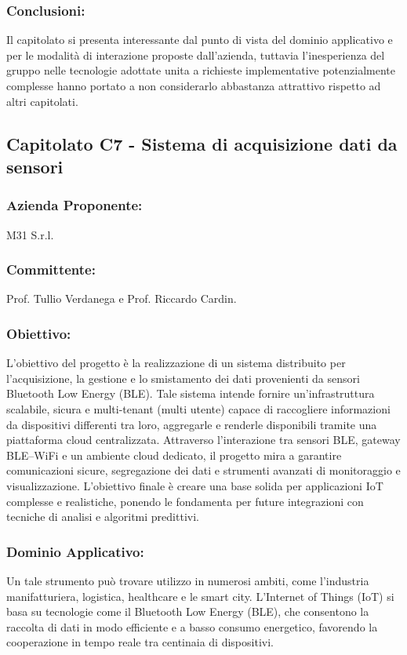 \documentclass[a4paper,12pt]{article}
\begin{document}
\subsubsection*{Conclusioni:}
Il capitolato si presenta interessante dal punto di vista del dominio applicativo e per le modalità di interazione proposte dall'azienda, tuttavia l'inesperienza del gruppo nelle tecnologie adottate unita a richieste implementative potenzialmente complesse hanno portato a non considerarlo abbastanza attrattivo rispetto ad altri capitolati.
\vspace{2.0cm}


\subsection{Capitolato C7 - Sistema di acquisizione dati da sensori}
\subsubsection*{Azienda Proponente:} M31 S.r.l.
\subsubsection*{Committente:} Prof. Tullio Verdanega e Prof. Riccardo Cardin.
\subsubsection*{Obiettivo:} 
L’obiettivo del progetto è la realizzazione di un sistema distribuito per l’acquisizione, la gestione e lo smistamento dei dati provenienti da sensori Bluetooth Low Energy (BLE). Tale sistema intende fornire un’infrastruttura scalabile, sicura e multi-tenant (multi utente) capace di raccogliere informazioni da dispositivi differenti tra loro, aggregarle e renderle disponibili tramite una piattaforma cloud centralizzata.
Attraverso l’interazione tra sensori BLE, gateway BLE–WiFi e un ambiente cloud dedicato, il progetto mira a garantire comunicazioni sicure, segregazione dei dati e strumenti avanzati di monitoraggio e visualizzazione. L’obiettivo finale è creare una base solida per applicazioni IoT complesse e realistiche, ponendo le fondamenta per future integrazioni con tecniche di analisi e algoritmi predittivi.
\subsubsection*{Dominio Applicativo:} 
Un tale strumento può trovare utilizzo in numerosi ambiti, come l'industria manifatturiera, logistica, healthcare e le smart city. L’Internet of Things (IoT) si basa su tecnologie come il Bluetooth Low Energy (BLE), che consentono la raccolta di dati in modo efficiente e a basso consumo energetico, favorendo la cooperazione in tempo reale tra centinaia di dispositivi.
\end{document}
